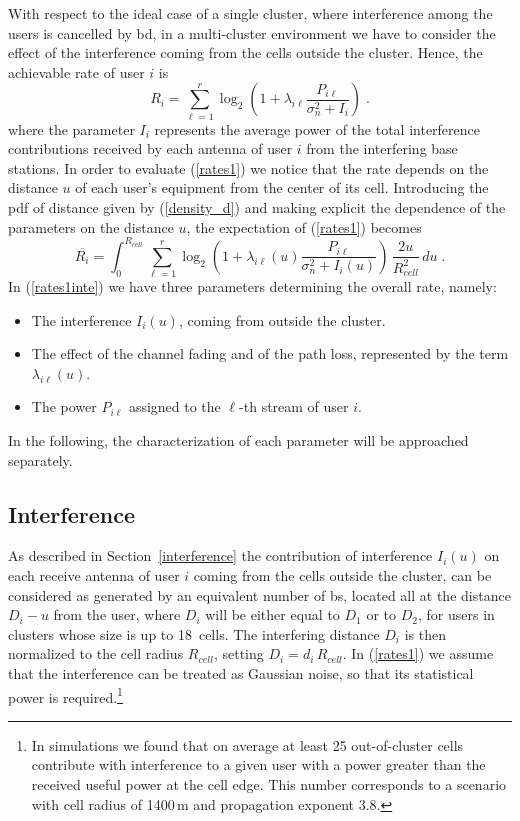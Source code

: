 With respect to the ideal case of a single cluster, where interference among the users is cancelled by \gls{bd}, 
in a multi-cluster environment we have to consider the effect of the
interference coming from the cells outside the cluster. Hence, the achievable rate of user $i$ is
\begin{equation}
 R_i=\sum_{\ell=1}^{r} \log_2\left(1+\lambda_{i\ell}\frac{P_{i\ell}}{\sigma_n^2+I_{i}}\right)\;.\label{rates1}
\end{equation}
where the parameter $I_i$ represents the average power of the total interference contributions received by each antenna of user $i$ from the interfering base stations. 
In order to evaluate (\ref{rates1}) we notice that the rate depends on the distance $u$ of each user's equipment from the center of its cell. Introducing the pdf of distance given by (\ref{density_d}) and making explicit the dependence of the parameters on the distance $u$, the expectation of (\ref{rates1}) becomes
\begin{equation}
 \overline{R_i}=\int_0^{R_{cell}}\sum_{\ell=1}^{r} \log_2\left(1+\lambda_{i\ell}(u)\frac{P_{i\ell}}{\sigma_n^2+I_i(u)}\right)\,\frac{2u}{R_{cell}^2}\,du\;.\label{rates1inte}
\end{equation}
In (\ref{rates1inte}) we have three parameters determining the overall rate, namely:
\begin{itemize}
 \item The interference $I_i(u)$, coming from outside the cluster.
 \item The effect of the channel fading and of the path loss, represented by the term $\lambda_{i\ell}(u)$.
 \item The power $P_{i\ell}$ assigned to the $\ell$-th stream of user $i$.
\end{itemize}  
In the following, the characterization of each parameter will be approached separately.

\subsection{Interference}

As described in Section~\ref{interference} the contribution of interference $I_i(u)$ on each receive antenna of user $i$ coming from the cells outside the cluster, can be considered as generated by an equivalent number of \gls{bs}, located all at the distance $D_i-u$ from the user, where $D_i$ will be either equal to $D_1$ or to $D_2$, for users in clusters whose size is up to 18~cells.
The interfering distance $D_i$ is then normalized to the cell radius $R_{cell}$, setting $D_i= d_i\,R_{cell}$.
In (\ref{rates1}) we assume that the interference can be treated as Gaussian noise, so that its statistical power is required.\footnote{In simulations we found that on average at least 25 out-of-cluster cells contribute with interference to a given user with a power greater than the received useful power at the cell edge. This number corresponds to a scenario with cell radius of 1400\,m and propagation exponent 3.8.}

